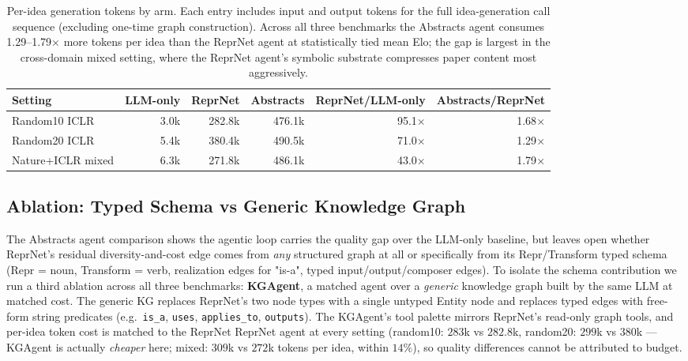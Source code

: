 \documentclass[10pt,twocolumn]{article}
\begin{document}
\begin{table}[t]
\centering
\small
\setlength{\tabcolsep}{4pt}
\begin{tabular}{lrrrrr}
\toprule
Setting & LLM-only & ReprNet & Abstracts & ReprNet/LLM-only & Abstracts/ReprNet \\
\midrule
Random10 ICLR        & 3.0k & 282.8k & 476.1k & 95.1$\times$ & 1.68$\times$ \\
Random20 ICLR        & 5.4k & 380.4k & 490.5k & 71.0$\times$ & 1.29$\times$ \\
Nature+ICLR mixed    & 6.3k & 271.8k & 486.1k & 43.0$\times$ & 1.79$\times$ \\
\bottomrule
\end{tabular}
\caption{Per-idea generation tokens by arm.  Each entry includes input
and output tokens for the full idea-generation call sequence
(excluding one-time graph construction).  Across all three benchmarks
the Abstracts agent consumes 1.29--1.79$\times$ more tokens per idea
than the ReprNet agent at statistically tied mean Elo; the gap is
largest in the cross-domain mixed setting, where the ReprNet agent's
symbolic substrate compresses paper content most aggressively.}
\label{tab:gencost}
\end{table}


\subsection{Ablation: Typed Schema vs Generic Knowledge Graph}

The Abstracts agent comparison shows the agentic loop carries the
quality gap over the LLM-only baseline, but leaves open whether
ReprNet's residual diversity-and-cost edge comes from \emph{any}
structured graph at all or specifically from its Repr/Transform
typed schema (Repr = noun, Transform = verb, realization edges for
"is-a", typed input/output/composer edges).  To isolate the schema
contribution we run a third ablation across all three benchmarks:
\textbf{KGAgent}, a matched agent over a \emph{generic} knowledge
graph built by the same LLM at matched cost.  The generic KG
replaces ReprNet's two node types with a single untyped Entity
node and replaces typed edges with free-form string predicates
(e.g.\ \texttt{is\_a}, \texttt{uses}, \texttt{applies\_to},
\texttt{outputs}).  The KGAgent's tool palette mirrors ReprNet's
read-only graph tools, and per-idea token cost is matched to the
ReprNet ReprNet agent at every setting (random10: $283$k vs $282.8$k,
random20: $299$k vs $380$k --- KGAgent is actually \emph{cheaper}
here; mixed: $309$k vs $272$k tokens per idea, within $14\%$), so
quality differences cannot be attributed to budget.
\end{document}
